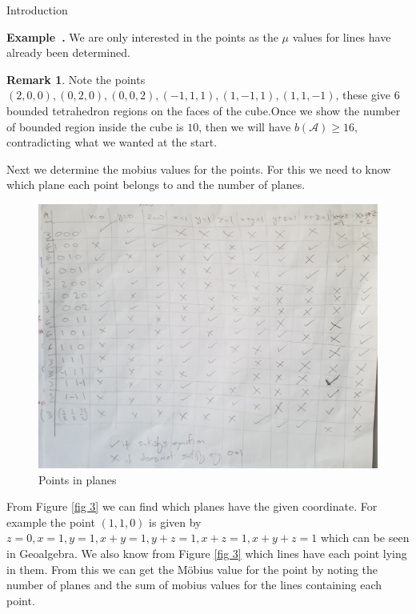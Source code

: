 \documentclass[a4paper,12pt]{article}
\newcounter{example}[]
\newenvironment{example}[1][]{\refstepcounter{example}\par\medskip
   \noindent \textbf{Example~\theexample. #1} \rmfamily}{\medskip}
\theoremstyle{definition}
\theoremstyle{indented}
\newtheorem*{remark}{Remark}
\begin{document}
\begin{section}{Introduction}
\begin{example}
We are only interested in the points as the $\mu$ values for lines have already been determined. 


\begin{remark} Note the points $(2,0,0), (0,2,0), (0,0,2), (-1,1,1),(1,-1,1) ,(1,1,-1)$, these give $6$ bounded tetrahedron regions on the faces of the cube.Once we show the number of bounded region inside the cube is $10$, then we will have $b(\mathcal{A}) \ge 16$, contradicting what we wanted at the start.
\end{remark}


Next we determine the mobius values for the points. For this we need to know which plane each point belongs to and the number of planes. 

\begin{figure}[H]
    \centering
 \includegraphics[scale=0.10,angle=0]{29072020 pics/Pointsplane.jpg}  
    \caption{Points in planes}
    \label{pointsplanes}
\end{figure}


 From Figure \ref{fig 3} we can find which planes have the given coordinate. For example the point $(1,1,0)$ is given by $z=0, x=1, y=1, x+y=1,y+z=1, x+z=1, x+y+z=1$ which can be seen in Geoalgebra. We also know from Figure \ref{fig 3} which lines have each point lying in them. From this we can get the Möbius value for the point by noting the number of planes and the sum of mobius values for the lines containing each point. 
 



\end{example}
\end{section}
\end{document}
